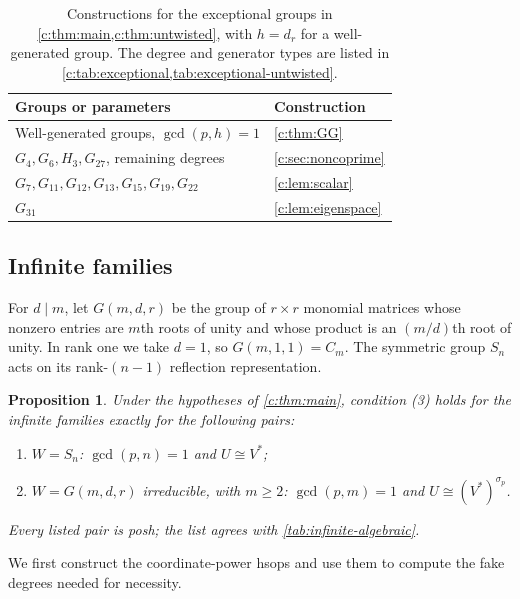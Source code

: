 \documentclass[10pt,a4paper]{amsart}
\newtheorem{proposition}[theorem]{Proposition}
\theoremstyle{definition}
\begin{document}
\begin{table}[htbp]
\centering
\begin{tabular}{@{}L{.61\textwidth}L{.31\textwidth}@{}}
\toprule
Groups or parameters & Construction\\
\midrule
Well-generated groups, $\gcd(p,h)=1$ & \cref{c:thm:GG}\\
$G_4,G_6,H_3,G_{27}$, remaining degrees & \cref{c:sec:noncoprime}\\
$G_7,G_{11},G_{12},G_{13},$\newline $G_{15},G_{19},G_{22}$ & \cref{c:lem:scalar}\\
$G_{31}$ & \cref{c:lem:eigenspace}\\
\bottomrule
\end{tabular}
\caption{Constructions for the exceptional groups in
\cref{c:thm:main,c:thm:untwisted}, with $h=d_r$ for a
well-generated group. The degree and generator types are listed in
\cref{c:tab:exceptional,tab:exceptional-untwisted}.}
\label{tab:exceptional-methods-overview}
\end{table}

\subsection{Infinite families}\label{c:sec:imprimitive}

For $d\mid m$, let $G(m,d,r)$ be the group of $r\times r$ monomial
matrices whose nonzero entries are $m$th roots of unity and whose
product is an $(m/d)$th root of unity. In rank one we take $d=1$,
so $G(m,1,1)=C_m$. The symmetric group $S_n$ acts on its
rank-$(n-1)$ reflection representation.

\begin{proposition}\label{c:prop:infinite-classification}
Under the hypotheses of \cref{c:thm:main}, condition (3) holds
for the infinite families
exactly for the following pairs:
\begin{enumerate}
\item $W=S_n$: $\gcd(p,n)=1$ and $U\cong V^*$;
\item $W=G(m,d,r)$ irreducible, with $m\ge2$:
$\gcd(p,m)=1$ and $U\cong(V^*)^{\sigma_p}$.
\end{enumerate}
Every listed pair is posh; the list agrees with \cref{tab:infinite-algebraic}.
\end{proposition}

We first construct the coordinate-power hsops and use them to compute
the fake degrees needed for necessity.
\end{document}
